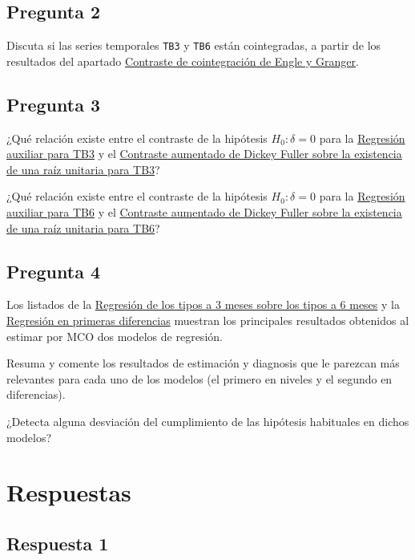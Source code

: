 \documentclass[10pt]{article}
\begin{document}
\subsection*{Pregunta 2}
\label{sec:org0e98855}

Discuta si las series temporales \texttt{TB3} y \texttt{TB6} están cointegradas, a
partir de los resultados del apartado \hyperref[sec:orga1b8793]{Contraste de cointegración de Engle y Granger}.
\subsection*{Pregunta 3}
\label{sec:org4bd3e2c}

¿Qué relación existe entre el contraste de la hipótesis \(H_0: \delta =
0\) para la \hyperref[sec:orga882c1a]{Regresión auxiliar para TB3} y el \hyperref[sec:org058c624]{Contraste aumentado de Dickey Fuller sobre la existencia de una raíz unitaria para TB3}?

¿Qué relación existe entre el contraste de la hipótesis \(H_0: \delta =
0\) para la \hyperref[sec:orgc3fb817]{Regresión auxiliar para TB6} y el \hyperref[sec:org5b9af83]{Contraste aumentado de Dickey Fuller sobre la existencia de una raíz unitaria para TB6}?
\subsection*{Pregunta 4}
\label{sec:org8c9c8da}

Los listados de la \hyperref[sec:org39fba0c]{Regresión de los tipos a 3 meses sobre los tipos a 6 meses} y la \hyperref[sec:org4caec88]{Regresión en primeras diferencias} muestran los
principales resultados obtenidos al estimar por MCO dos modelos de
regresión.

Resuma y comente los resultados de estimación y diagnosis que le
parezcan más relevantes para cada uno de los modelos (el primero en
niveles y el segundo en diferencias).

¿Detecta alguna desviación del cumplimiento de las hipótesis
habituales en dichos modelos?

\newpage
\section*{Respuestas}
\label{sec:orgdffe661}


\subsection*{Respuesta 1}
\label{sec:org3f85f98}
\end{document}
